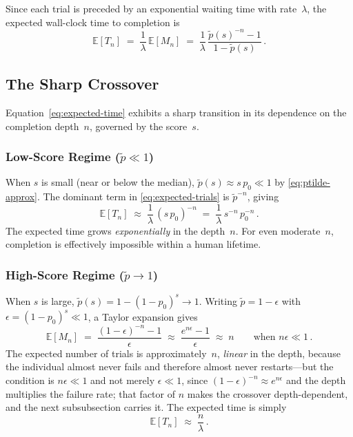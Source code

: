 \documentclass{article}
\begin{document}
Since each trial is preceded by an exponential waiting time with
rate~$\lambda$, the expected wall-clock time to completion is
\begin{equation}\label{eq:expected-time}
  \mathbb{E}[T_n]
  \;=\;
  \frac{1}{\lambda}\,\mathbb{E}[M_n]
  \;=\;
  \frac{1}{\lambda}\,
  \frac{\widetilde{p}(s)^{-n} - 1}{1 - \widetilde{p}(s)}\,.
\end{equation}

\subsection{The Sharp Crossover}\label{ssec:phase}

Equation~\eqref{eq:expected-time} exhibits a sharp transition in its
dependence on the completion depth~$n$, governed by the score~$s$.

\subsubsection{Low-Score Regime ($\widetilde{p} \ll 1$)}

When $s$ is small (near or below the median), $\widetilde{p}(s) \approx
s\,p_0 \ll 1$ by \eqref{eq:ptilde-approx}. The dominant term in
\eqref{eq:expected-trials} is $\widetilde{p}^{-n}$, giving
\begin{equation}\label{eq:exp-regime}
  \mathbb{E}[T_n]
  \;\approx\;
  \frac{1}{\lambda}\,(s\,p_0)^{-n}
  \;=\;
  \frac{1}{\lambda}\,s^{-n}\,p_0^{-n}\,.
\end{equation}
The expected time grows \emph{exponentially} in the depth~$n$. For even
moderate~$n$, completion is effectively impossible within a human
lifetime.

\subsubsection{High-Score Regime ($\widetilde{p} \to 1$)}

When $s$ is large, $\widetilde{p}(s) = 1 - (1-p_0)^s \to 1$. Writing
$\widetilde{p} = 1 - \epsilon$ with $\epsilon = (1-p_0)^s \ll 1$, a
Taylor expansion gives
\begin{equation}\label{eq:lin-regime}
  \mathbb{E}[M_n]
  \;=\;
  \frac{(1-\epsilon)^{-n} - 1}{\epsilon}
  \;\approx\;
  \frac{e^{n\epsilon} - 1}{\epsilon}
  \;\approx\;
  n \qquad \text{when } n\epsilon \ll 1\,.
\end{equation}
The expected number of trials is approximately~$n$, \emph{linear} in
the depth, because the individual almost never fails and therefore almost
never restarts---but the condition is $n\epsilon \ll 1$ and not merely $\epsilon \ll 1$, since $(1-\epsilon)^{-n} \approx e^{n\epsilon}$ and the depth multiplies the failure rate; that factor of $n$ makes the crossover depth-dependent, and the next subsubsection carries it. The expected time is simply
\begin{equation}\label{eq:time-linear}
  \mathbb{E}[T_n] \;\approx\; \frac{n}{\lambda}\,.
\end{equation}
\end{document}
